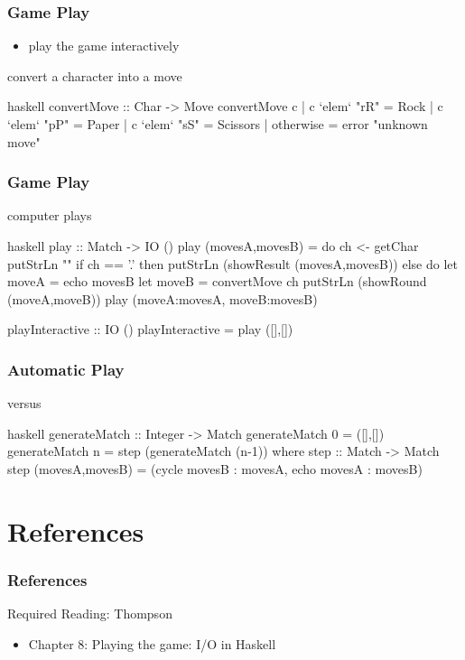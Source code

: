 \documentclass[dvipsnames]{beamer}
\theoremstyle{plain}
\begin{document}
\begin{frame}[fragile]
  \frametitle{Game Play}

  \begin{itemize}
    \item play the game interactively
  \end{itemize}

  \begin{exampleblock}{convert a character into a move}
    \begin{pygments}{haskell}
convertMove :: Char -> Move
convertMove c
  | c `elem` "rR" = Rock
  | c `elem` "pP" = Paper
  | c `elem` "sS" = Scissors
  | otherwise     = error "unknown move"
    \end{pygments}
  \end{exampleblock}
\end{frame}

\begin{frame}[fragile]
  \frametitle{Game Play}

  \begin{exampleblock}{computer plays }
    \begin{pygments}{haskell}
play :: Match -> IO ()
play (movesA,movesB) =
    do ch <- getChar
       putStrLn ""
       if ch == '.'
           then putStrLn (showResult (movesA,movesB))
           else do let moveA = echo movesB
                   let moveB = convertMove ch
                   putStrLn (showRound (moveA,moveB))
                   play (moveA:movesA, moveB:movesB)

playInteractive :: IO ()
playInteractive = play ([],[])
    \end{pygments}
  \end{exampleblock}
\end{frame}

\begin{frame}[fragile]
  \frametitle{Automatic Play}

  \begin{exampleblock}{ versus }
    \begin{pygments}{haskell}
generateMatch :: Integer -> Match
generateMatch 0 = ([],[])
generateMatch n = step (generateMatch (n-1))
  where
    step :: Match -> Match
    step (movesA,movesB) = (cycle movesB : movesA,
                            echo movesA : movesB)
    \end{pygments}
  \end{exampleblock}
\end{frame}

\section*{References}

\begin{frame}
  \frametitle{References}

  \begin{block}{Required Reading: Thompson}
    \begin{itemize}
      \item Chapter 8: \alert{Playing the game: I/O in Haskell}
    \end{itemize}
  \end{block}
\end{frame}
\end{document}
